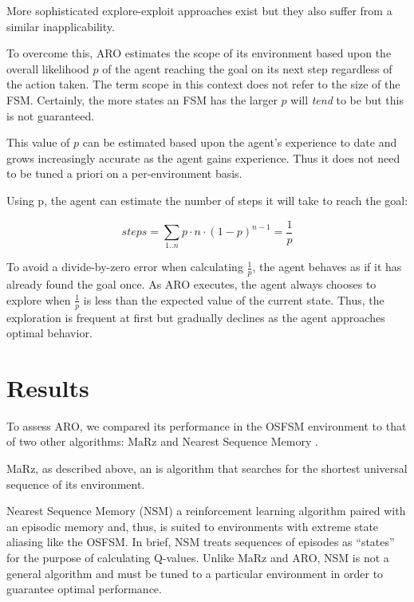 \documentclass[letterpaper]{article} %
\begin{document}
More sophisticated explore-exploit approaches exist \cite{Kearns99,Brafman02}
but they also suffer from a similar inapplicability.


To overcome this, ARO estimates the scope of its environment based
upon the overall likelihood $p$ of the agent reaching the goal on its
next step regardless of the action taken.  The term scope in this
context does not refer to the size of the FSM.  Certainly, the more
states an FSM has the larger $p$ will \textit{tend} to be but this is
not guaranteed.

This value of $p$ can be estimated based upon the agent's experience
to date and grows increasingly accurate as the agent gains
experience.  Thus it does not need to be tuned a priori on a
per-environment basis.

Using p, the agent can estimate the number of steps it will take to
reach the goal:

\begin{center}
     $$steps = \sum_{1..n} p \cdot n \cdot (1-p)^{n-1}  = \frac{1}{p}$$
\end{center}


To avoid a divide-by-zero error when calculating $\frac{1}{p}$, the
agent behaves as if it has already found the goal once.  As ARO
executes, the agent always chooses to explore when $\frac{1}{p}$ is
less than the expected value of the current state.  Thus, the
exploration is frequent at first but gradually declines as the agent
approaches optimal behavior.


\section{Results}

To assess ARO, we compared its performance in the OSFSM environment to
that of two other algorithms: MaRz \cite{Rodriguez17} and Nearest
Sequence Memory \cite{McCallum95}.

MaRz, as described above, an is algorithm that searches for the
shortest universal sequence of its environment.

Nearest Sequence Memory (NSM) a reinforcement learning algorithm
paired with an episodic memory and, thus, is suited to environments
with extreme state aliasing like the OSFSM.  In brief, NSM treats
sequences of episodes as ``states'' for the purpose of calculating
Q-values.  Unlike MaRz and ARO, NSM is not a general algorithm and
must be tuned to a particular environment in order to guarantee
optimal performance.
\end{document}
